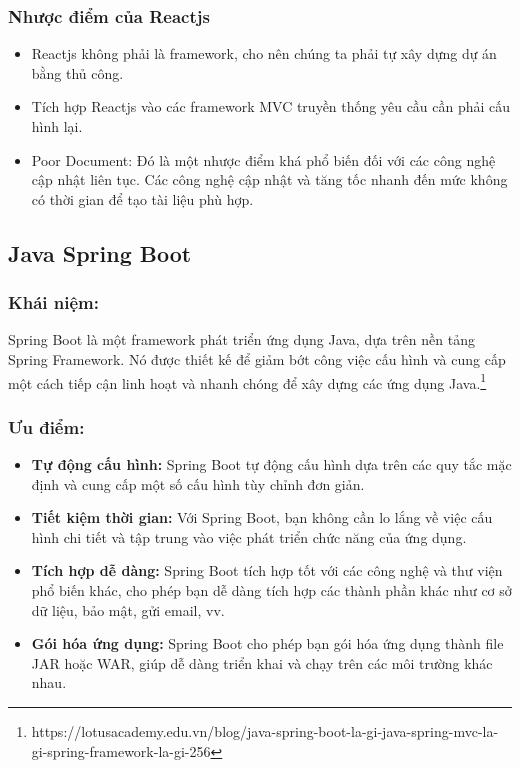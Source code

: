 \subsubsection{Nhược điểm của Reactjs}
\begin{itemize}
    \item Reactjs không phải là framework, cho nên chúng ta phải tự xây dựng dự án bằng thủ công.
    \item Tích hợp Reactjs vào các framework MVC truyền thống yêu cầu cần phải cấu hình lại.
    \item Poor Document: Đó là một nhược điểm khá phổ biến đối với các công nghệ cập nhật liên tục. Các công nghệ cập nhật và tăng tốc nhanh đến mức không có thời gian để tạo tài liệu phù hợp.
\end{itemize}
\subsection{Java Spring Boot}

\subsubsection{Khái niệm:} Spring Boot là một framework phát triển ứng dụng Java, dựa trên nền tảng Spring Framework. Nó được thiết kế để giảm bớt công việc cấu hình và cung cấp một cách tiếp cận linh hoạt và nhanh chóng để xây dựng các ứng dụng Java.\footnote{https://lotusacademy.edu.vn/blog/java-spring-boot-la-gi-java-spring-mvc-la-gi-spring-framework-la-gi-256}

\subsubsection{Ưu điểm:}
\begin{itemize}
    \item \textbf{Tự động cấu hình:} Spring Boot tự động cấu hình dựa trên các quy tắc mặc định và cung cấp một số cấu hình tùy chỉnh đơn giản.
    \item \textbf{Tiết kiệm thời gian:} Với Spring Boot, bạn không cần lo lắng về việc cấu hình chi tiết và tập trung vào việc phát triển chức năng của ứng dụng.
    \item \textbf{Tích hợp dễ dàng:} Spring Boot tích hợp tốt với các công nghệ và thư viện phổ biến khác, cho phép bạn dễ dàng tích hợp các thành phần khác như cơ sở dữ liệu, bảo mật, gửi email, vv.
    \item \textbf{Gói hóa ứng dụng:} Spring Boot cho phép bạn gói hóa ứng dụng thành file JAR hoặc WAR, giúp dễ dàng triển khai và chạy trên các môi trường khác nhau.
\end{itemize}

